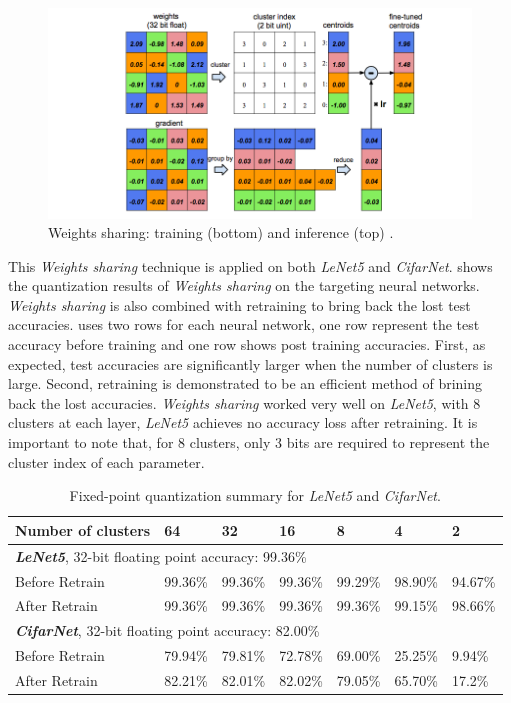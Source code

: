 \documentclass[a4paper,12pt]{report}
\begin{document}
\begin{figure}[!h]
\centering
\includegraphics[width=\textwidth]{fig_weights_share.png}
\caption{\label{fig:weights_share}Weights sharing: training (bottom) and inference (top) \cite{Han15}.}
\end{figure}

This \textit{Weights sharing} technique is applied on both \textit{LeNet5} and
\textit{CifarNet}.
 shows the quantization results of \textit{Weights sharing} on
the targeting neural networks.
\textit{Weights sharing} is also combined with retraining to bring back the
lost test accuracies.
 uses two rows for each neural network, one row represent the test accuracy
before training and one row shows post training accuracies.
First, as expected, test accuracies are significantly larger when the number of clusters
is large.
Second, retraining is demonstrated to be an efficient method of brining back the
lost accuracies.
\textit{Weights sharing} worked very well on \textit{LeNet5}, with 8 clusters at each
layer, \textit{LeNet5} achieves no accuracy loss after retraining.
It is important to note that, for 8 clusters, only 3 bits are required to
represent the cluster index of each parameter.

\begin{table}[!h]
  \centering
  \begin{tabular}{lllllll}
    \hline
    \hline
    Number of clusters      &64         &32       &16       &8        &4        &2  \\
    \hline
    \hline
    \multicolumn{5}{l}{\textbf{\textit{LeNet5}}, 32-bit floating point accuracy: 99.36\%}\\
    \hline
    Before Retrain          &99.36\%    &99.36\%  &99.36\%  &99.29\%  &98.90\%  &94.67\%\\
    After Retrain           &99.36\%    &99.36\%  &99.36\%  &99.36\%  &99.15\%  &98.66\%\\
    \hline
    \hline
    \multicolumn{5}{l}{\textbf{\textit{CifarNet}}, 32-bit floating point accuracy: 82.00\%}\\
    \hline
    Before Retrain          &79.94\%    &79.81\%  &72.78\%  &69.00\%  &25.25\%  &9.94\%\\
    After Retrain           &82.21\%    &82.01\%  &82.02\%  &79.05\%  &65.70\%  &17.2\%\\
    \hline
    \hline
  \end{tabular}
  \caption{Fixed-point quantization summary for \textit{LeNet5} and \textit{CifarNet}.}
  \label{tab:ws_sum}
\end{table}
\end{document}
